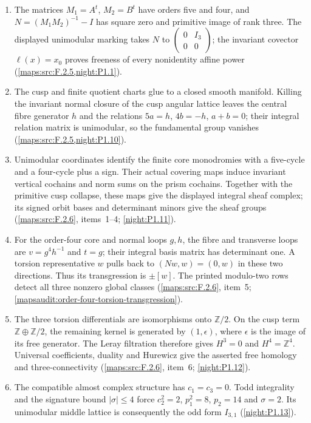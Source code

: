 \begin{enumerate}[label=\arabic*.]
\item The matrices $M_1=A^t$, $M_2=B^t$ have orders five and four, and
  $N=(M_1M_2)^{-1}-I$ has square zero and primitive image of rank three.
  The displayed unimodular marking takes $N$ to
  $\left(\begin{smallmatrix}0&I_3\\0&0\end{smallmatrix}\right)$;
  the invariant covector $\ell(x)=x_0$ proves freeness of every
  nonidentity affine power
  (\cref{maps:src:F.2.5,night:P1.1}).
\item The cusp and finite quotient charts glue to a closed smooth
  manifold.  Killing the invariant normal closure of the cusp angular lattice
  leaves the central fibre generator $h$ and the relations $5a=h$, $4b=-h$, $a+b=0$;
  their integral relation matrix is unimodular, so the fundamental
  group vanishes (\cref{maps:src:F.2.5,night:P1.10}).
\item Unimodular coordinates identify the finite core monodromies
  with a five-cycle and a four-cycle plus a sign.  Their actual
  covering maps induce invariant vertical cochains and norm sums
  on the prism cochains.  Together with the primitive cusp collapse,
  these maps give the displayed integral sheaf complex; its signed
  orbit bases and determinant minors give the sheaf groups
  (\cref{maps:src:F.2.6}, items~1--4; \cref{night:P1.11}).
\item For the order-four core and normal loops $g,h$, the fibre and
  transverse loops are $v=g^4h^{-1}$ and $t=g$; their integral
  basis matrix has determinant one.  A torsion representative $w$
  pulls back to $(Nw,w)=(0,w)$ in these two directions.
  Thus its transgression is $\pm[w]$.  The printed modulo-two
  rows detect all three nonzero global classes
  (\cref{maps:src:F.2.6}, item~5;
  \cref{mapsaudit:order-four-torsion-transgression}).
\item The three torsion differentials are isomorphisms onto
  $\mathbb Z/2$.  On the cusp term $\mathbb Z\oplus\mathbb Z/2$,
  the remaining kernel is generated by $(1,\epsilon)$, where
  $\epsilon$ is the image of its free generator.
  The Leray filtration therefore gives $H^3=0$ and
  $H^4=\mathbb Z^4$.  Universal coefficients, duality and
  Hurewicz give the asserted free homology and three-connectivity
  (\cref{maps:src:F.2.6}, item~6; \cref{night:P1.12}).
\item The compatible almost complex structure has $c_1=c_3=0$.
  Todd integrality and the signature bound $|\sigma|\leq4$ force
  $c_2^2=2$, $p_1^2=8$, $p_2=14$ and $\sigma=2$.
  Its unimodular middle lattice is consequently the odd form
  $I_{3,1}$ (\cref{night:P1.13}).
\end{enumerate}

